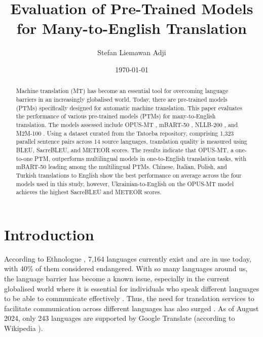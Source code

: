 \documentclass[a4paper, 11pt]{article}
\title{Evaluation of Pre-Trained Models for Many-to-English Translation}
\author{Stefan Liemawan Adji}
\date{\today}
\begin{document}
\maketitle


\begin{abstract}
    Machine translation (MT) has become an essential tool for overcoming language barriers in an increasingly globalised world. Today, there are pre-trained models (PTMs) specifically designed for automatic machine translation. This paper evaluates the performance of various pre-trained models (PTMs) for many-to-English translation. The models assessed include OPUS-MT \cite{tiedemann-2020-opus-mt}, mBART-50 \cite{liu-2020-mbart}, NLLB-200 \cite{nllb200-2020}, and M2M-100 \cite{fan-2020-m2m100}. Using a dataset curated from the Tatoeba repository, comprising 1,323 parallel sentence pairs across 14 source languages, translation quality is measured using BLEU, SacreBLEU, and METEOR scores. The results indicate that OPUS-MT, a one-to-one PTM, outperforms multilingual models in one-to-English translation tasks, with mBART-50 leading among the multilingual PTMs. Chinese, Italian, Polish, and Turkish translations to English show the best performance on average across the four models used in this study, however, Ukrainian-to-English on the OPUS-MT model achieves the highest SacreBLEU and METEOR scores.
\end{abstract}

\section{Introduction}

According to Ethnologue \cite{ethnologue-2024}, 7,164 languages currently exist and are in use today, with 40\% of them considered endangered. With so many languages around us, the language barrier has become a known issue, especially in the current globalised world where it is essential for individuals who speak different languages to be able to communicate effectively \cite{nakamura-2009-overcoming}. Thus, the need for translation services to facilitate communication across different languages has also surged \cite{okpor-2014-machine-ta}. As of August 2024, only 243 languages are supported by Google Translate (according to Wikipedia \cite{wikipedia-google-translate}).
\end{document}
